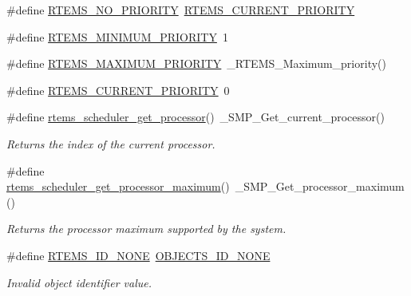 \begin{DoxyCompactItemize}
\item 
\#define \mbox{\hyperlink{group__ClassicTasks_ga3ba355e613ccbe3d0a4a80b961d5832b}{R\+T\+E\+M\+S\+\_\+\+N\+O\+\_\+\+P\+R\+I\+O\+R\+I\+TY}}~\mbox{\hyperlink{group__ClassicTasks_ga49bfed4e201631e3a17158e32dc0314b}{R\+T\+E\+M\+S\+\_\+\+C\+U\+R\+R\+E\+N\+T\+\_\+\+P\+R\+I\+O\+R\+I\+TY}}
\item 
\#define \mbox{\hyperlink{group__ClassicTasks_ga4f6daa11e05fc2d5f47e8426a4d6d4d5}{R\+T\+E\+M\+S\+\_\+\+M\+I\+N\+I\+M\+U\+M\+\_\+\+P\+R\+I\+O\+R\+I\+TY}}~1
\item 
\#define \mbox{\hyperlink{group__ClassicTasks_ga5db28fd197129084aaede29389af1872}{R\+T\+E\+M\+S\+\_\+\+M\+A\+X\+I\+M\+U\+M\+\_\+\+P\+R\+I\+O\+R\+I\+TY}}~\+\_\+\+R\+T\+E\+M\+S\+\_\+\+Maximum\+\_\+priority()
\item 
\#define \mbox{\hyperlink{group__ClassicTasks_ga49bfed4e201631e3a17158e32dc0314b}{R\+T\+E\+M\+S\+\_\+\+C\+U\+R\+R\+E\+N\+T\+\_\+\+P\+R\+I\+O\+R\+I\+TY}}~0
\item 
\#define \mbox{\hyperlink{group__ClassicTasks_gac7891d8a0bfe04de75c7c9e89f174cab}{rtems\+\_\+scheduler\+\_\+get\+\_\+processor}}()~\+\_\+\+S\+M\+P\+\_\+\+Get\+\_\+current\+\_\+processor()
\begin{DoxyCompactList}\small\item\em Returns the index of the current processor. \end{DoxyCompactList}\item 
\#define \mbox{\hyperlink{group__ClassicTasks_ga3bfd90bb42ab219bc15b7b97ffc596b9}{rtems\+\_\+scheduler\+\_\+get\+\_\+processor\+\_\+maximum}}()~\+\_\+\+S\+M\+P\+\_\+\+Get\+\_\+processor\+\_\+maximum()
\begin{DoxyCompactList}\small\item\em Returns the processor maximum supported by the system. \end{DoxyCompactList}\item 
\#define \mbox{\hyperlink{group__ClassicTasks_gad7ba85a9018caa1adb89bd5d0e2abea8}{R\+T\+E\+M\+S\+\_\+\+I\+D\+\_\+\+N\+O\+NE}}~\mbox{\hyperlink{group__RTEMSScoreObject_ga39c027c946ce38b5a77192c60130a1de}{O\+B\+J\+E\+C\+T\+S\+\_\+\+I\+D\+\_\+\+N\+O\+NE}}
\begin{DoxyCompactList}\small\item\em Invalid object identifier value. \end{DoxyCompactList}\end{DoxyCompactItemize}
